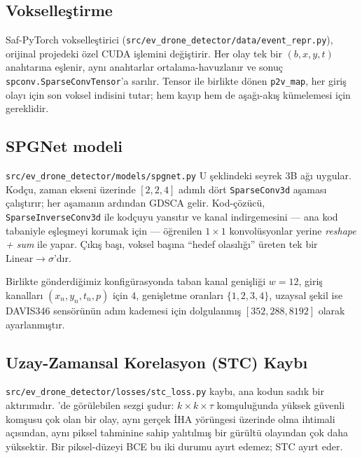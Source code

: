 \documentclass[11pt,a4paper]{article}
\begin{document}
\subsection{Vokselle\c{s}tirme}

Saf-PyTorch vokselle\c{s}tirici
(\texttt{src/ev\_drone\_detector/data/event\_repr.py}), orijinal
projedeki \"ozel CUDA i\c{s}lemini de\u{g}i\c{s}tirir. Her olay
tek bir $(b, x, y, t)$ anahtar{\i}na e\c{s}lenir, ayn{\i} anahtarlar
ortalama-havuzlan{\i}r ve sonu\c{c}
\texttt{spconv.SparseConvTensor}'a sar{\i}l{\i}r. Tensor ile birlikte
d\"onen \texttt{p2v\_map}, her giri\c{s} olay{\i} i\c{c}in son
voksel indisini tutar; hem kay{\i}p hem de a\c{s}a\u{g}{\i}-ak{\i}\c{s}
k\"umelemesi i\c{c}in gereklidir.

\subsection{SPGNet modeli}

\texttt{src/ev\_drone\_detector/models/spgnet.py} U \c{s}eklindeki
seyrek 3B a\u{g}{\i} uygular. Kod\c{c}u, zaman ekseni \"uzerinde
$[2, 2, 4]$ ad{\i}ml{\i} d\"ort \texttt{SparseConv3d} a\c{s}amas{\i}
\c{c}al{\i}\c{s}t{\i}r{\i}r; her a\c{s}aman{\i}n ard{\i}ndan GDSCA
gelir. Kod-\c{c}\"oz\"uc\"u, \texttt{SparseInverseConv3d} ile
kod\c{c}uyu yans{\i}t{\i}r ve kanal indirgemesini --- ana kod tabaniyle
e\c{s}le\c{s}meyi korumak i\c{c}in --- \"o\u{g}renilen $1 \times 1$
konvol\"usyonlar yerine \emph{reshape + sum} ile yapar. \c{C}{\i}k{\i}\c{s}
ba\c{s}{\i}, voksel ba\c{s}{\i}na ``hedef olas{\i}l{\i}\u{g}{\i}''
\"ureten tek bir $\text{Linear}\!\to\!\sigma$'d{\i}r.

Birlikte g\"onderdi\u{g}imiz konfig\"urasyonda taban kanal geni\c{s}li\u{g}i
$w = 12$, giri\c{s} kanallar{\i} $(x_n, y_n, t_n, p)$ i\c{c}in $4$,
geni\c{s}letme oranlar{\i} $\{1, 2, 3, 4\}$, uzaysal \c{s}ekil ise
DAVIS346 sens\"or\"un\"un ad{\i}m kademesi i\c{c}in dolgulanm{\i}\c{s}
$[352, 288, 8192]$ olarak ayarlanm{\i}\c{s}t{\i}r.

\subsection{Uzay-Zamansal Korelasyon (STC) Kayb{\i}}

\texttt{src/ev\_drone\_detector/losses/stc\_loss.py} kayb{\i},
ana kodun sad{\i}k bir akt{\i}r{\i}m{\i}d{\i}r.
\cite[Fig.~5]{chen2025evspsegnet}'de g\"or\"ulebilen sezgi \c{s}udur:
$k\!\times\!k\!\times\!\tau$ kom\c{s}ulu\u{g}unda y\"uksek g\"uvenli
kom\c{s}usu \c{c}ok olan bir olay, ayn{\i} ger\c{c}ek \.{I}HA
y\"or\"ungesi \"uzerinde olma ihtimali a\c{c}{\i}s{\i}ndan, ayn{\i} piksel
tahminine sahip yal{\i}t{\i}lm{\i}\c{s} bir g\"ur\"ult\"u olay{\i}ndan
\c{c}ok daha y\"uksektir. Bir piksel-d\"uzeyi BCE bu iki durumu
ay{\i}rt edemez; STC ay{\i}rt eder.
\end{document}
